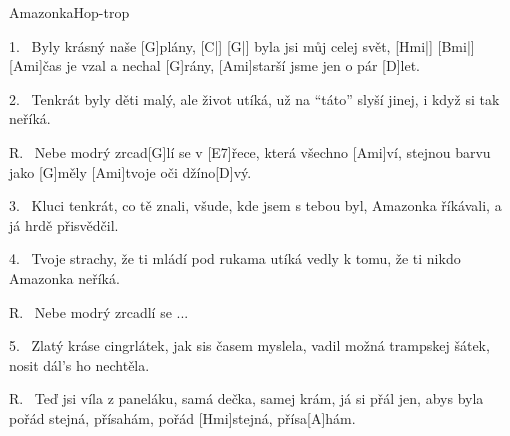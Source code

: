 \pagestyle{empty}

\begin{song}{Amazonka}{Hop-trop}

\begin{xverse}{1.~}
Byly krásný naše [\large G]plány, [\large C|]{} [\large G|]{}
byla jsi můj celej svět, [\large Hmi|]{} [\large Bmi|]{}
[\large Ami]{}čas je vzal a nechal [\large G]rány,
[\large Ami]starší jsme jen o pár [\large D]let.
\end{xverse}

\begin{xverse}{2.~}
Tenkrát byly děti malý, ale život utíká,
už na ``táto'' slyší jinej, i když si tak neříká.
\end{xverse}

\begin{xverse}{R.~}
Nebe modrý zrcad[\large G]lí se
v [\large E7]{}řece, která všechno [\large Ami]ví,
stejnou barvu jako [\large G]měly
[\large Ami]tvoje oči džíno[\large D]vý.
\end{xverse}

\begin{xverse}{3.~}
Kluci tenkrát, co tě znali,  všude, kde jsem s tebou byl,
Amazonka říkávali, a já hrdě přisvědčil.
\end{xverse}

\begin{xverse}{4.~}
Tvoje strachy, že ti mládí pod rukama utíká
vedly k tomu, že ti nikdo Amazonka neříká.
\end{xverse}

\begin{xverse}{R.~}
Nebe modrý zrcadlí se ...
\end{xverse}

\begin{xverse}{5.~}
Zlatý kráse cingrlátek, jak sis časem myslela,
vadil možná trampskej šátek, nosit dál's ho nechtěla.
\end{xverse}

\begin{xverse}{R.~}
Teď jsi víla z paneláku, samá dečka, samej krám,
já si přál jen, abys byla pořád stejná, přísahám,
pořád [\large Hmi]stejná, přísa[\large A]hám.
\end{xverse}

\end{song}

\setcounter{page}{1}

